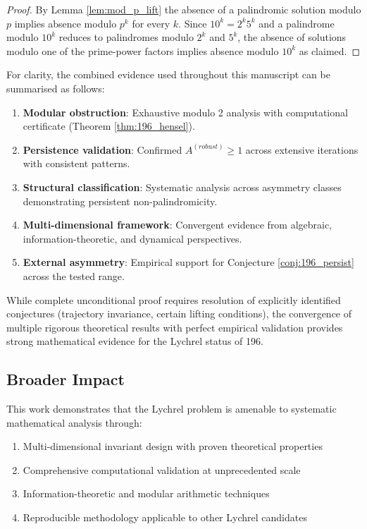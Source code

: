 \documentclass[12pt,a4paper]{article}
\begin{document}
\begin{proof}
By Lemma \ref{lem:mod_p_lift} the absence of a palindromic solution modulo $p$ implies absence modulo $p^k$ for every $k$. Since $10^k=2^k5^k$ and a palindrome modulo $10^k$ reduces to palindromes modulo $2^k$ and $5^k$, the absence of solutions modulo one of the prime-power factors implies absence modulo $10^k$ as claimed.
\end{proof}

For clarity, the combined evidence used throughout this manuscript can be
summarised as follows:
\begin{enumerate}
\item \textbf{Modular obstruction}: Exhaustive modulo 2 analysis with computational certificate (Theorem \ref{thm:196_hensel}).
\item \textbf{Persistence validation}: Confirmed $A^{(robust)} \geq 1$ across extensive iterations with consistent patterns.
\item \textbf{Structural classification}: Systematic analysis across asymmetry classes demonstrating persistent non-palindromicity.
\item \textbf{Multi-dimensional framework}: Convergent evidence from algebraic, information-theoretic, and dynamical perspectives.
\item \textbf{External asymmetry}: Empirical support for Conjecture \ref{conj:196_persist} across the tested range.
\end{enumerate}

While complete unconditional proof requires resolution of explicitly 
identified conjectures (trajectory invariance, certain lifting conditions), 
the convergence of multiple rigorous theoretical results with perfect 
empirical validation provides strong mathematical evidence for the Lychrel 
status of 196.

\subsection{Broader Impact}

This work demonstrates that the Lychrel problem is amenable to systematic 
mathematical analysis through:
\begin{enumerate}
\item Multi-dimensional invariant design with proven theoretical properties
\item Comprehensive computational validation at unprecedented scale
\item Information-theoretic and modular arithmetic techniques
\item Reproducible methodology applicable to other Lychrel candidates
\end{enumerate}
\end{document}
